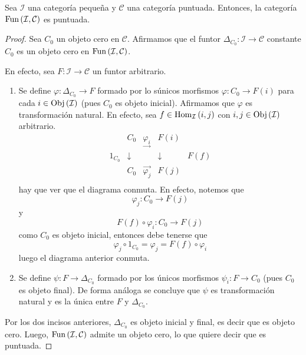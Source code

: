\documentclass[12pt]{report}
\theoremstyle{largebreak}
\newcommand\cf[3]{\ensuremath{#1:#2\rightarrow#3}}
\newcommand{\Obj}[1]{\ensuremath{\textup{Obj}\left(#1\right)}}
\newcommand{\Hom}[3]{\ensuremath{\textup{Hom}_{#1}\left(#2,#3\right)}}
\newcommand{\Fun}[2]{\ensuremath{\textup{Fun}\left(#1,#2\right)}}
\begin{document}
    \begin{propo}
        Sea $\mathcal{I}$ una categoría pequeña y $\mathcal{C}$ una categoría puntuada. Entonces, la categoría $\Fun{\mathcal{I}}{\mathcal{C}}$ es puntuada.
    \end{propo}

    \renewcommand{\theenumi}{\arabic{enumi}}

    \begin{proof}
        Sea $C_0$ un objeto cero en $\mathcal{C}$. Afirmamos que el funtor $\cf{\Delta_{C_0}}{\mathcal{I}}{\mathcal{C}}$ constante $C_0$ es un objeto cero en $\Fun{\mathcal{I}}{\mathcal{C}}$.

        En efecto, sea $\cf{F}{\mathcal{I}}{\mathcal{C}}$ un funtor arbitrario.
        \begin{enumerate}
            \item Se define $\cf{\varphi}{\Delta_{C_0}}{F}$ formado por lo súnicos morfismos $\cf{\varphi}{C_0}{F(i)}$ para cada $i\in\Obj{\mathcal{I}}$ (pues $C_0$ es objeto inicial). Afirmamos que $\varphi$ es transformación natural. En efecto, sea $f\in\Hom{\mathcal{I}}{i}{j}$ con $i,j\in\Obj{\mathcal{I}}$ arbitrario.
            \begin{equation*}
                \begin{array}{rcccl}
                    & C_0 & \underset{\longrightarrow}{\varphi_i} & F(i) &\\
                    1_{C_0} & \downarrow & & \downarrow & F(f) \\
                    & C_0 & \overset{\longrightarrow}{\varphi_j} & F(j) &\\
                \end{array}
            \end{equation*}
            hay que ver que el diagrama conmuta. En efecto, notemos que
            \begin{equation*}
                \cf{\varphi_j}{C_0}{F(j)}
            \end{equation*}
            y
            \begin{equation*}
                \cf{F(f)\circ\varphi_i}{C_0}{F(j)}
            \end{equation*}
            como $C_0$ es objeto inicial, entonces debe tenerse que
            \begin{equation*}
                \varphi_j\circ 1_{C_0}=\varphi_j=F(f)\circ\varphi_i
            \end{equation*}
            luego el diagrama anterior conmuta.

            \item Se define $\cf{\psi}{F}{\Delta_{C_0}}$ formado por los únicos morfismos $\cf{\psi_i}{F}{C_0}$ (pues $C_0$ es objeto final). De forma análoga se concluye que $\psi$ es transformación natural y es la única entre $F$ y $\Delta_{C_0}$.
        \end{enumerate}
        Por los dos incisos anteriores, $\Delta_{C_0}$ es objeto inicial y final, es decir que es objeto cero. Luego, $\Fun{\mathcal{I}}{\mathcal{C}}$ admite un objeto cero, lo que quiere decir que es puntuada.
    \end{proof}
\end{document}

